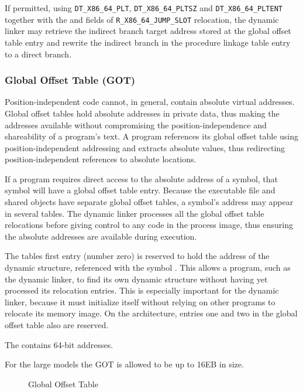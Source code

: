 If permitted, using \texttt{DT_X86_64_PLT}, \texttt{DT_X86_64_PLTSZ} and
\texttt{DT_X86_64_PLTENT} together with the  and
 fields of \texttt{R_X86_64_JUMP_SLOT} relocation, the
dynamic linker may retrieve the indirect branch target address stored at
the global offset table entry and rewrite the indirect branch in the
procedure linkage table entry to a direct branch.

\subsubsection{Global Offset Table (GOT)}
\label{got}

Position-independent code cannot, in general, contain absolute virtual
addresses. Global offset tables hold absolute addresses in private
data, thus making the addresses available without compromising the
position-independence and shareability of a program's text. A program
references its global offset table using position-independent
addressing and extracts absolute values, thus redirecting
position-independent references to absolute locations.
 
If a program requires direct access to the absolute address of a
symbol, that symbol will have a global offset table entry. Because
the executable file and shared objects have separate global offset
tables, a symbol's address may appear in several tables. The dynamic
linker processes all the global offset table relocations before giving
control to any code in the process image, thus ensuring the absolute
addresses are available during execution.

The tables first entry (number zero) is reserved to hold the address
of the dynamic
structure, referenced with the symbol . This allows a
program, such as the dynamic linker, to find its own dynamic structure
without having yet processed its relocation entries. This is
especially important for the dynamic linker, because it must
initialize itself without relying on other programs to relocate its
memory image. On the \xARCH architecture, entries one and two in the
global offset table also are reserved. 

The  contains 64-bit addresses.

For the large models the GOT is allowed to be up to 16EB in size.

\begin{figure}[H]
\Hrule
\caption{Global Offset Table}
\begin{center}
\end{center}
\Hrule
\end{figure}

